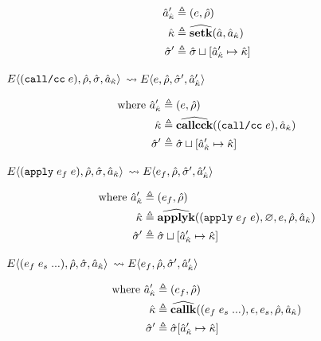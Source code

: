 \documentclass[12pt,draft]{article}
\newcommand{\applysyn}[2]{(\texttt{apply}\;#1\;#2)}
\newcommand{\callccsyn}[1]{(\texttt{call/cc}\;#1)}
\newcommand{\E}[4]{E\langle #1 , #2 , #3 , #4 \rangle}
\begin{document}
\begin{multicols*}{2}
\begin{align*}
    \hat{a}_{\hat{\kappa}}' &\triangleq (e, \hat{\rho}) \\
    \hat{\kappa} &\triangleq \widehat{\textbf{setk}}(\hat{a} , \hat{a}_{\hat{\kappa}}) \\
    \hat{\sigma}' &\triangleq \hat{\sigma} \sqcup [\hat{a}_{\hat{\kappa}}' \mapsto \hat{\kappa}]
  \end{align*}
  \begin{center}
    $\E{\callccsyn{e}}{\aenv}{\astore}{\akaddr}$
    $\leadsto \E{e}{\aenv}{\astore'}{\akaddr'}$
  \end{center}
  \vspace{-7mm}
  \begin{align*}
    \text{where }
    \akaddr' &\triangleq (e , \aenv) \\
    \akont &\triangleq \acallcck{\callccsyn{e}}{\akaddr} \\
    \astore' &\triangleq \astore \sqcup [\akaddr' \mapsto \akont]
  \end{align*}
  \vfill\null
  \columnbreak
  \begin{center}
    $\E{\applysyn{e_f}{e}}{\aenv}{\astore}{\akaddr}$
    $\leadsto \E{e_f}{\aenv}{\astore'}{\akaddr'}$
  \end{center}
  \vspace{-7mm}
  \begin{align*}
    \text{where }
    \akaddr' &\triangleq (e_f , \aenv) \\
    \akont &\triangleq\aapplyk{\applysyn{e_f}{e}}{\varnothing}{e}{\aenv}{\akaddr} \\
    \astore' &\triangleq \astore \sqcup [\akaddr' \mapsto \akont]
  \end{align*}
  \begin{center}
    $\E{(e_f \; e_s \; ...)}{\aenv}{\astore}{\akaddr}$
    $\leadsto \E{e_f}{\aenv}{\astore'}{\akaddr'}$
  \end{center}
  \vspace{-7mm}
  \begin{align*}
    \text{where }
    \hat{a}_{\hat{\kappa}}' &\triangleq (e_f , \hat{\rho}) \\
    \hat{\kappa}&\triangleq\widehat{\textbf{callk}}((e_f \; e_s \; ...) , \epsilon , e_s , \hat{\rho} , \hat{a}_{\hat{\kappa}}) \\
    \hat{\sigma}' &\triangleq \hat{\sigma} [\hat{a}_{\hat{\kappa}}' \mapsto \hat{\kappa}]
  \end{align*}
\end{multicols*}
\end{document}
